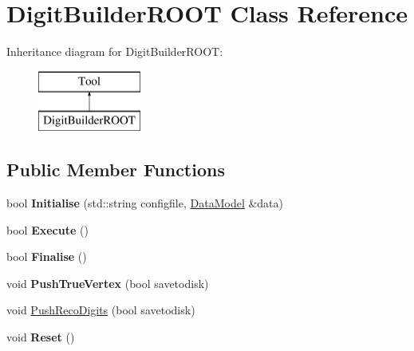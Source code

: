 \hypertarget{classDigitBuilderROOT}{\section{Digit\-Builder\-R\-O\-O\-T Class Reference}
\label{classDigitBuilderROOT}
}
Inheritance diagram for Digit\-Builder\-R\-O\-O\-T\-:\begin{figure}[H]
\begin{center}
\leavevmode
\includegraphics[height=2.000000cm]{classDigitBuilderROOT}
\end{center}
\end{figure}
\subsection*{Public Member Functions}
\begin{DoxyCompactItemize}
\item 
\hypertarget{classDigitBuilderROOT_a7ab06541c442a8bc03adc0c7a4b32086}{bool {\bfseries Initialise} (std\-::string configfile, \hyperlink{classDataModel}{Data\-Model} \&data)}\label{classDigitBuilderROOT_a7ab06541c442a8bc03adc0c7a4b32086}

\item 
\hypertarget{classDigitBuilderROOT_a9529acec5b1a6cf468e57c96bf55453d}{bool {\bfseries Execute} ()}\label{classDigitBuilderROOT_a9529acec5b1a6cf468e57c96bf55453d}

\item 
\hypertarget{classDigitBuilderROOT_a1beb47fea60dc16f627a339ee0597e71}{bool {\bfseries Finalise} ()}\label{classDigitBuilderROOT_a1beb47fea60dc16f627a339ee0597e71}

\item 
\hypertarget{classDigitBuilderROOT_a894cb087ddb66f65fe966d4155b03256}{void {\bfseries Push\-True\-Vertex} (bool savetodisk)}\label{classDigitBuilderROOT_a894cb087ddb66f65fe966d4155b03256}

\item 
void \hyperlink{classDigitBuilderROOT_af623aff0f8d4b58cb4c7182da49b76b7}{Push\-Reco\-Digits} (bool savetodisk)
\item 
\hypertarget{classDigitBuilderROOT_a01cd5fb15e6ebe304ba751652de2b37b}{void {\bfseries Reset} ()}\label{classDigitBuilderROOT_a01cd5fb15e6ebe304ba751652de2b37b}

\end{DoxyCompactItemize}


